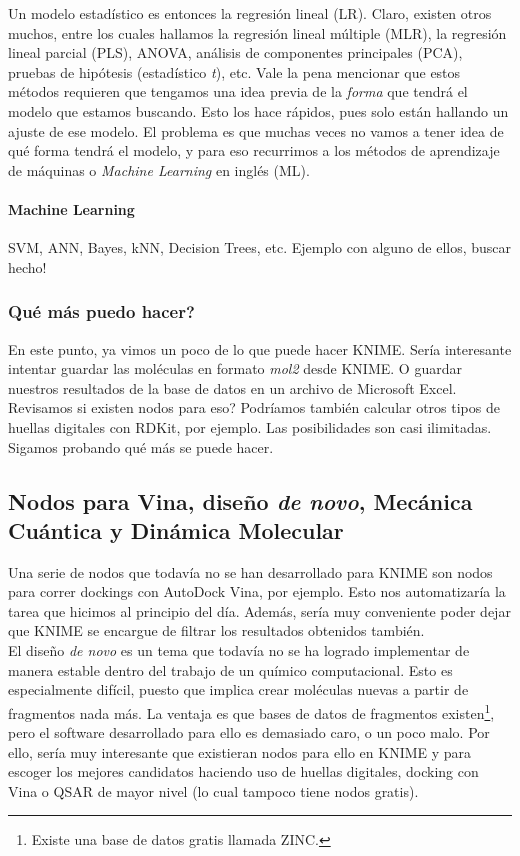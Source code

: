 \documentclass[10pt,letterpaper]{article}
\begin{document}
Un modelo estad\'istico es entonces la regresi\'on lineal (LR). Claro, existen otros muchos, entre los cuales hallamos la regresi\'on lineal m\'ultiple (MLR), la regresi\'on lineal parcial (PLS), ANOVA, an\'alisis de componentes principales (PCA), pruebas de hip\'otesis (estad\'istico \emph{t}), etc. Vale la pena mencionar que estos m\'etodos requieren que tengamos una idea previa de la \textit{forma} que tendr\'a el modelo que estamos buscando. Esto los hace r\'apidos, pues solo est\'an hallando un ajuste de ese modelo. El problema es que muchas veces no vamos a tener idea de qu\'e forma tendr\'a el modelo, y para eso recurrimos a los m\'etodos de aprendizaje de m\'aquinas o \emph{Machine Learning} en ingl\'es (ML).

\paragraph{Machine Learning}


SVM, ANN, Bayes, kNN, Decision Trees, etc.
Ejemplo con alguno de ellos, buscar hecho!

\subsubsection{Qu\'e m\'as puedo hacer?}
En este punto, ya vimos un poco de lo que puede hacer KNIME. Ser\'ia interesante intentar guardar las mol\'eculas en formato \emph{mol2} desde KNIME. O guardar nuestros resultados de la base de datos en un archivo de Microsoft Excel. Revisamos si existen nodos para eso? Podr\'iamos tambi\'en calcular otros tipos de huellas digitales con RDKit, por ejemplo. Las posibilidades son casi ilimitadas. Sigamos probando qu\'e m\'as se puede hacer.

\subsection{Nodos para Vina, dise\~no \emph{de novo}, Mec\'anica Cu\'antica y Din\'amica Molecular}
Una serie de nodos que todav\'ia no se han desarrollado para KNIME son nodos para correr dockings con AutoDock Vina, por ejemplo. Esto nos automatizar\'ia la tarea que hicimos al principio del d\'ia. Adem\'as, ser\'ia muy conveniente poder dejar que KNIME se encargue de filtrar los resultados obtenidos tambi\'en.\\

El dise\~no \emph{de novo} es un tema que todav\'ia no se ha logrado implementar de manera estable dentro del trabajo de un qu\'imico computacional. Esto es especialmente dif\'icil, puesto que implica crear mol\'eculas nuevas a partir de fragmentos nada m\'as. La ventaja es que bases de datos de fragmentos existen\footnote{Existe una base de datos gratis llamada ZINC.}, pero el software desarrollado para ello es demasiado caro, o un poco malo. Por ello, ser\'ia muy interesante que existieran nodos para ello en KNIME y para escoger los mejores candidatos haciendo uso de huellas digitales, docking con Vina o QSAR de mayor nivel (lo cual tampoco tiene nodos gratis).\\
\end{document}
